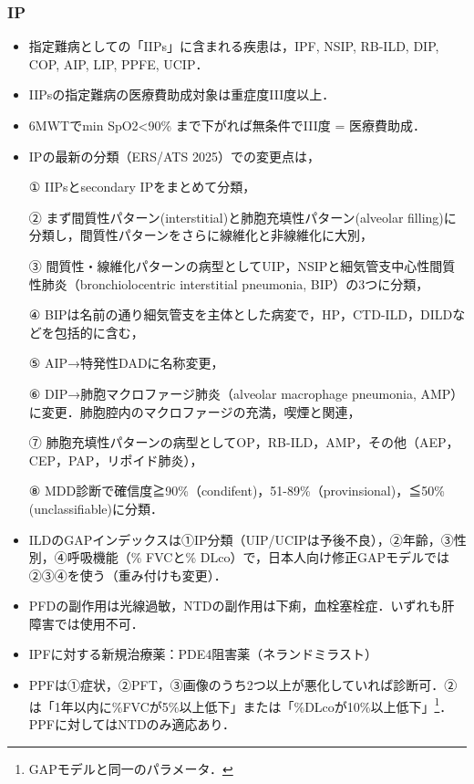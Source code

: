 \subsubsection{IP}

\begin{itemize}
\item 指定難病としての「IIPs」に含まれる疾患は，IPF, NSIP, RB-ILD, DIP, COP, AIP, LIP, PPFE, UCIP．
\item IIPsの指定難病の医療費助成対象は重症度III度以上．
\item 6MWTでmin SpO2<90\% まで下がれば無条件でIII度 = 医療費助成．
\item IPの最新の分類（ERS/ATS 2025）での変更点は，

① IIPsとsecondary IPをまとめて分類，

② まず間質性パターン(interstitial)と肺胞充填性パターン(alveolar filling)に分類し，間質性パターンをさらに線維化と非線維化に大別，

③ 間質性・線維化パターンの病型としてUIP，NSIPと細気管支中心性間質性肺炎（bronchiolocentric interstitial pneumonia, BIP）の3つに分類，

④ BIPは名前の通り細気管支を主体とした病変で，HP，CTD-ILD，DILDなどを包括的に含む，

⑤ AIP→特発性DADに名称変更，

⑥ DIP→肺胞マクロファージ肺炎（alveolar macrophage pneumonia, AMP）に変更．肺胞腔内のマクロファージの充満，喫煙と関連，

⑦ 肺胞充填性パターンの病型としてOP，RB-ILD，AMP，その他（AEP，CEP，PAP，リポイド肺炎），

⑧ MDD診断で確信度≧90\%（condifent)，51-89\%（provinsional)，≦50\% (unclassifiable)に分類．

\item ILDのGAPインデックスは①IP分類（UIP/UCIPは予後不良），②年齢，③性別，④呼吸機能（\% FVCと\% DLco）で，日本人向け修正GAPモデルでは②③④を使う（重み付けも変更）．

\item PFDの副作用は光線過敏，NTDの副作用は下痢，血栓塞栓症．いずれも肝障害では使用不可．
\item IPFに対する新規治療薬：PDE4阻害薬（ネランドミラスト）
\item PPFは①症状，②PFT，③画像のうち2つ以上が悪化していれば診断可．②は「1年以内に\%FVCが5\%以上低下」または「\%DLcoが10\%以上低下」\footnote{GAPモデルと同一のパラメータ．}．PPFに対してはNTDのみ適応あり．


\end{itemize}
